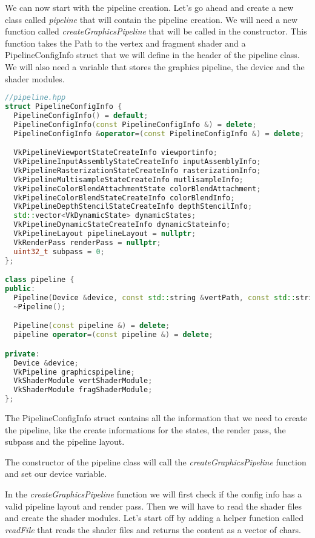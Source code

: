 \documentclass[12pt]{report} \usepackage{preamble}
\begin{document}
We can now start with the pipeline creation. Let's go ahead and create a new class called \textit{pipeline} that will
contain the pipeline creation. We will need a new function called \textit{createGraphicsPipeline} that will be called
in the constructor. This function takes the Path to the vertex and fragment shader and a PipelineConfigInfo struct that
we will define in the header of the pipeline class. We will also need a variable that stores the graphics pipeline, the
device and the shader modules.

\begin{lstlisting}[language=C++]
//pipeline.hpp
struct PipelineConfigInfo {
  PipelineConfigInfo() = default;
  PipelineConfigInfo(const PipelineConfigInfo &) = delete;
  PipelineConfigInfo &operator=(const PipelineConfigInfo &) = delete;

  VkPipelineViewportStateCreateInfo viewportinfo;
  VkPipelineInputAssemblyStateCreateInfo inputAssemblyInfo;
  VkPipelineRasterizationStateCreateInfo rasterizationInfo;
  VkPipelineMultisampleStateCreateInfo mutlisampleInfo;
  VkPipelineColorBlendAttachmentState colorBlendAttachment;
  VkPipelineColorBlendStateCreateInfo colorBlendInfo;
  VkPipelineDepthStencilStateCreateInfo depthStencilInfo;
  std::vector<VkDynamicState> dynamicStates;
  VkPipelineDynamicStateCreateInfo dynamicStateinfo;
  VkPipelineLayout pipelineLayout = nullptr;
  VkRenderPass renderPass = nullptr;
  uint32_t subpass = 0;
};

class pipeline {
public:
  Pipeline(Device &device, const std::string &vertPath, const std::string &fragPath, const pipelineconfig &configInfo);
  ~Pipeline();

  Pipeline(const pipeline &) = delete;
  pipeline operator=(const pipeline &) = delete;

private:
  Device &device;
  VkPipeline graphicspipeline;
  VkShaderModule vertShaderModule;
  VkShaderModule fragShaderModule;
};
\end{lstlisting}

The PipelineConfigInfo struct contains all the information that we need to create the pipeline, like the create informations
for the states, the render pass, the subpass and the pipeline layout.

The constructor of the pipeline class will call the \textit{createGraphicsPipeline} function and set our device variable.

In the \textit{createGraphicsPipeline} function we will first check if the config info has a valid pipeline layout and render pass.
Then we will have to read the shader files and create the shader modules. Let's start off by adding a helper function called
\textit{readFile} that reads the shader files and returns the content as a vector of chars.
\end{document}
